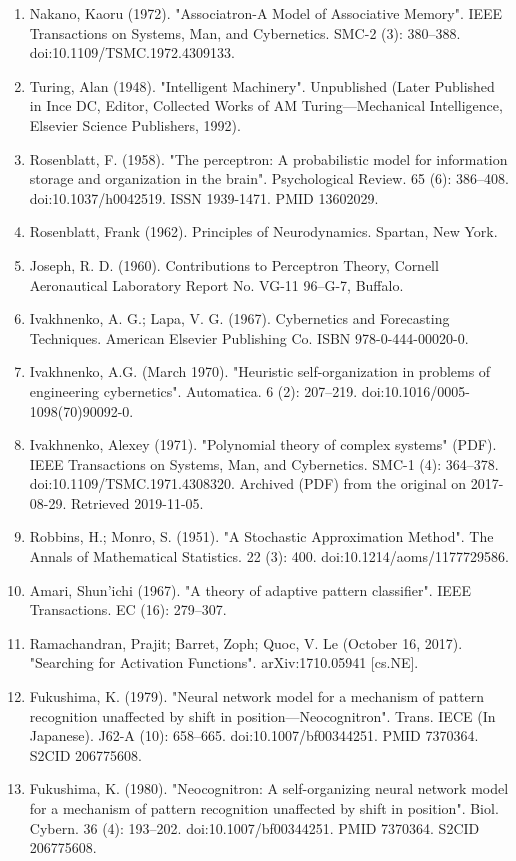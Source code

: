 \begin{enumerate}
\item Nakano, Kaoru (1972). "Associatron-A Model of Associative Memory". IEEE Transactions on Systems, Man, and Cybernetics. SMC-2 (3): 380–388. doi:10.1109/TSMC.1972.4309133.
\item Turing, Alan (1948). "Intelligent Machinery". Unpublished (Later Published in Ince DC, Editor, Collected Works of AM Turing—Mechanical Intelligence, Elsevier Science Publishers, 1992).
\item Rosenblatt, F. (1958). "The perceptron: A probabilistic model for information storage and organization in the brain". Psychological Review. 65 (6): 386–408. doi:10.1037/h0042519. ISSN 1939-1471. PMID 13602029.
\item Rosenblatt, Frank (1962). Principles of Neurodynamics. Spartan, New York.
\item Joseph, R. D. (1960). Contributions to Perceptron Theory, Cornell Aeronautical Laboratory Report No. VG-11 96--G-7, Buffalo.
\item Ivakhnenko, A. G.; Lapa, V. G. (1967). Cybernetics and Forecasting Techniques. American Elsevier Publishing Co. ISBN 978-0-444-00020-0.
\item Ivakhnenko, A.G. (March 1970). "Heuristic self-organization in problems of engineering cybernetics". Automatica. 6 (2): 207–219. doi:10.1016/0005-1098(70)90092-0.
\item Ivakhnenko, Alexey (1971). "Polynomial theory of complex systems" (PDF). IEEE Transactions on Systems, Man, and Cybernetics. SMC-1 (4): 364–378. doi:10.1109/TSMC.1971.4308320. Archived (PDF) from the original on 2017-08-29. Retrieved 2019-11-05.
\item Robbins, H.; Monro, S. (1951). "A Stochastic Approximation Method". The Annals of Mathematical Statistics. 22 (3): 400. doi:10.1214/aoms/1177729586.
\item Amari, Shun'ichi (1967). "A theory of adaptive pattern classifier". IEEE Transactions. EC (16): 279–307.
\item Ramachandran, Prajit; Barret, Zoph; Quoc, V. Le (October 16, 2017). "Searching for Activation Functions". arXiv:1710.05941 [cs.NE].
\item Fukushima, K. (1979). "Neural network model for a mechanism of pattern recognition unaffected by shift in position—Neocognitron". Trans. IECE (In Japanese). J62-A (10): 658–665. doi:10.1007/bf00344251. PMID 7370364. S2CID 206775608.
\item Fukushima, K. (1980). "Neocognitron: A self-organizing neural network model for a mechanism of pattern recognition unaffected by shift in position". Biol. Cybern. 36 (4): 193–202. doi:10.1007/bf00344251. PMID 7370364. S2CID 206775608.

\end{enumerate}

